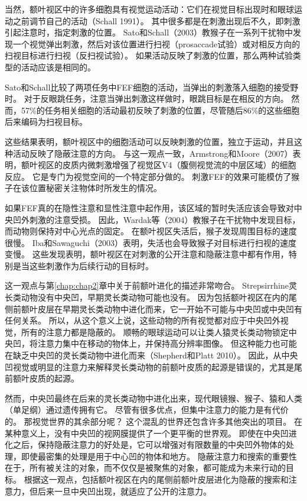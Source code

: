 当然，额叶视区中的许多细胞具有视觉运动活动：它们在视觉目标出现时和眼球运动之前调节自己的活动（Schall 1991）。
其中很多都是在刺激出现后不久，即刺激引起注意时，指定刺激的位置。
Sato和Schall（2003）教猴子在一系列干扰物中发现一个视觉弹出刺激，然后对该位置进行扫视（prosaccade试验）或对相反方向的扫视目标进行扫视（反扫视试验）。
如果活动反映了刺激的位置，那么两种试验类型的活动应该是相同的。


Sato和Schall比较了两项任务中FEF细胞的活动，当弹出的刺激落入细胞的接受野时。
对于反眼跳任务，注意当弹出刺激这样做时，眼跳目标是在相反的方向。
然而，57\%的任务相关细胞的活动最初反映了刺激的位置，尽管随后86\%的这些细胞后来编码为扫视目标。


这些结果表明，额叶视区中的细胞活动可以反映刺激的位置，独立于运动，并且这种活动反映了隐蔽注意的方向。
与这一观点一致，Armstrong和Moore（2007）表明，额叶视区的皮质内微刺激增强了视觉区V4（腹侧视觉流的中层区域）的细胞反应。
它是专门为视觉空间的一个特定部分做的。
刺激FEF的效果可能模仿了猴子在该位置秘密关注物体时所发生的情况。


如果FEF真的在隐性注意和显性注意中起作用，该区域的暂时失活应该会导致对中央凹外刺激的注意受损。
因此，Wardak等（2004）教猴子在干扰物中发现目标，而动物则保持对中心光点的固定。
在额叶视区失活后，猴子发现周围目标的速度很慢。
Iba和Sawaguchi（2003）表明，失活也会导致猴子对目标进行扫视的速度变慢。
这些发现表明，额叶视区在对刺激的公开注意和隐蔽注意中都有作用，特别是当这些刺激作为后续行动的目标时。


这一观点与第\ref{chap:chap2}章中关于前额叶进化的描述非常吻合。
Strepsirrhine灵长类动物没有中央凹，早期灵长类动物可能也没有。
因为包括额叶视区在内的尾侧前额叶皮层在早期灵长类动物中进化而来，它一开始不可能与中央凹或中央凹有任何关系。
所以，从这个意义上说，这些动物的所有视觉都对应于中央凹外视觉，所有的注意力都是隐蔽的。
顺畅的眼球运动可以让类人猿灵长类动物锁定中央凹，将注意力集中在移动的物体上，并保持高分辨率图像。
但这种能力也可能在缺乏中央凹的灵长类动物中进化而来（Shepherd和Platt 2010）。
因此，从中央凹视觉或明显的注意力来解释灵长类动物的前额叶皮质的起源是错误的，尤其是尾前额叶皮质的起源。


然而，中央凹最终在后来的灵长类动物中进化出来，现代眼镜猴、猴子、猿和人类（单足纲）通过遗传拥有它。
尽管有很多优点，但集中注意力的能力是有代价的。
那视觉世界的其余部分呢？
这个混乱的世界还包含许多其他突出的项目。
在某种意义上，没有中央凹的视网膜提供了一个更平衡的世界观。
即使在中央凹进化之后，保持隐蔽注意力的好处是，它可以增强对有限数量的中央凹外物体的处理，即使最密集的处理是用于中心凹的物体和地方。
隐蔽注意力和搜索的重要性在于，所有被关注的对象，而不仅仅是被聚焦的对象，都可能成为未来行动的目标。
根据这一观点，包括额叶视区在内的尾侧前额叶皮层进化为隐蔽的搜索和注意力，但后来一旦中央凹出现，就适应了公开的注意力。




